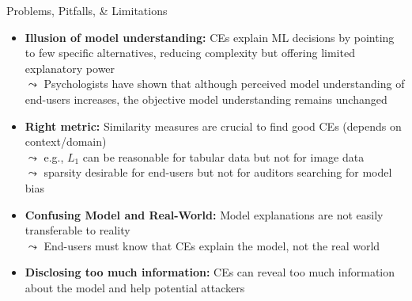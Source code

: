 \documentclass[10pt,compress,t,notes=noshow, xcolor=table]{beamer}
\begin{document}
\begin{frame}{Problems, Pitfalls, \& Limitations}
\begin{itemize}[<+->]
    \item \textbf{Illusion of model understanding:} 
    CEs explain ML decisions by pointing to few specific alternatives, reducing complexity but offering limited explanatory power\\
    $\leadsto$ %
    Psychologists have shown that although perceived model understanding of end-users increases, the objective model understanding remains unchanged
    
    \item \textbf{Right metric:} Similarity measures are crucial to find good CEs (depends on context/domain)\\
    $\leadsto$ e.g., $L_1$ can be reasonable for tabular data but not for image data\\
    $\leadsto$ sparsity desirable for end-users but not for auditors searching for model bias

    \item \textbf{Confusing Model and Real-World:} Model explanations are not easily transferable to reality\\
    $\leadsto$ End-users must know that CEs explain the model, not the real world %
    \item \textbf{Disclosing too much information:} 
    CEs can reveal too much information about the model and help potential attackers
    \end{itemize}
\end{frame}
\end{document}
